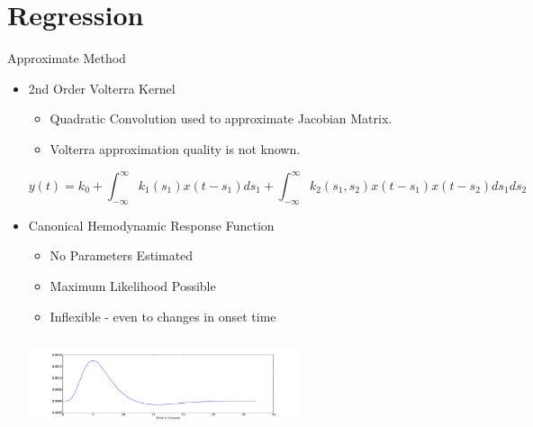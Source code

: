 \documentclass{beamer}
\begin{document}
\section{Regression}
\begin{frame}{Approximate Method}
  \begin{itemize}
    \item 2nd Order Volterra Kernel \cite{Friston2000}
    \begin{itemize}
        \item Quadratic Convolution used to approximate Jacobian Matrix.
        \item Volterra approximation quality is not known.
    \end{itemize}
    {\footnotesize
    $$y(t) = k_0 + \int_{-\infty}^{\infty} k_1(s_1) x(t-s_1) ds_1
        + \int_{-\infty}^{\infty} k_2(s_1,s_2) x(t-s_1)x(t-s_2) ds_1 ds_2$$
    }
    \item Canonical Hemodynamic Response Function
    \begin{itemize}
        \item No Parameters Estimated
        \item Maximum Likelihood Possible
        \item Inflexible - even to changes in onset time
    \end{itemize}
    \begin{center}
    \includegraphics[clip=true,trim=4.88cm 0cm 5cm 1.5cm,height=2.7cm,width=8cm]{HRF}
    \end{center}
    
  \end{itemize}
\end{frame}
\end{document}
